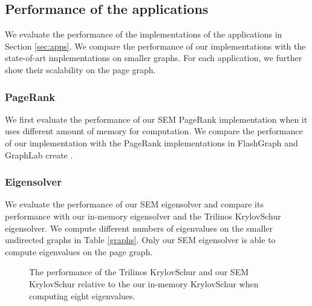%		
%		

\subsection{Performance of the applications}

We evaluate the performance of the implementations of the applications in
Section \ref{sec:apps}. We compare the performance of our implementations
with the state-of-art implementations on smaller graphs. For each application,
we further show their scalability on the page graph.

\subsubsection{PageRank}
We first evaluate the performance of our SEM PageRank implementation when
it uses different amount of memory for computation. We compare the performance
of our implementation with the PageRank implementations in FlashGraph
\cite{flashgraph} and GraphLab create \cite{}.

\subsubsection{Eigensolver}

We evaluate the performance of our SEM eigensolver and compare its performance
with our in-memory eigensolver and the Trilinos KrylovSchur eigensolver.
We compute different numbers of eigenvalues on the smaller undirected graphs in
Table \ref{graphs}. Only our SEM eigensolver is able to compute eigenvalues
on the page graph.

\begin{figure}
	\begin{center}
		\footnotesize
		
		\caption{The performance of the Trilinos KrylovSchur and our SEM KrylovSchur
		relative to the our in-memory KrylovSchur when computing eight eigenvalues.}
		\label{fig:eigen}
	\end{center}
\end{figure}


